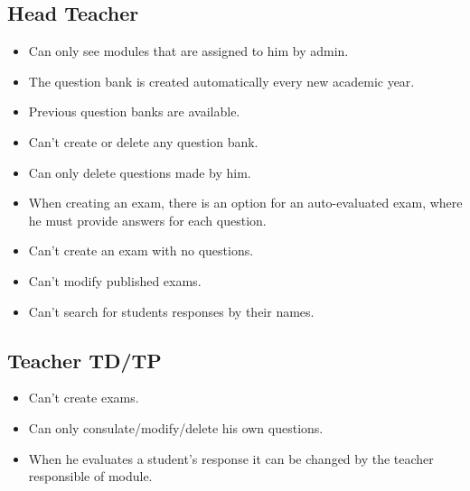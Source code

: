\documentclass[]{uc2pfecaneva}
\begin{document}
    \raggedright\subsection{Head Teacher}
    \begin{itemize}
        \item Can only see modules that are assigned to him by admin.
        \item The question bank is created automatically every new academic year.
        \item Previous question banks are available.
        \item Can’t create or delete any question bank.
        \item Can only delete questions made by him.
        \item When creating an exam, there is an option for an auto-evaluated exam, where he must provide answers for each question.
        \item Can’t create an exam with no questions.
        \item Can’t modify published exams.
        \item Can’t search for students responses by their names.
    \end{itemize}

    \raggedright\subsection{Teacher TD/TP}
    \begin{itemize}
        \item Can’t create exams.
        \item Can only consulate/modify/delete his own questions.
        \item When he evaluates a student’s response it can be changed by the teacher responsible of module.
    \end{itemize}
\end{document}
